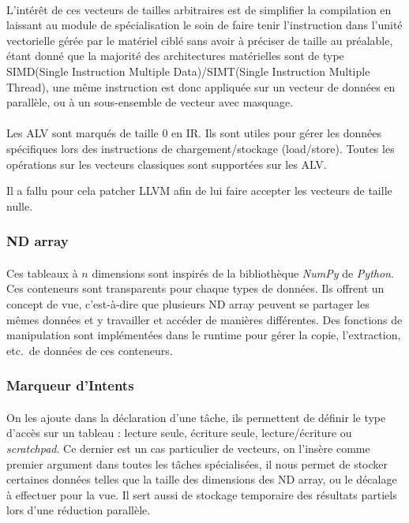 \paragraph{}
L'intérêt de ces vecteurs de tailles arbitraires est de simplifier la
compilation en laissant au module de spécialisation le soin de faire tenir
l'instruction dans l'unité vectorielle gérée par le matériel ciblé sans avoir à
préciser de taille au préalable, étant donné que la majorité des architectures
matérielles sont de type SIMD(Single Instruction Multiple Data)/SIMT(Single
Instruction Multiple Thread), une même instruction est donc appliquée sur un
vecteur de données en parallèle, ou à un sous-ensemble de vecteur avec
masquage.

\paragraph{}
Les ALV sont marqués de taille 0 en IR. Ils sont utiles pour gérer les données
spécifiques lors des instructions de chargement/stockage (load/store). Toutes
les opérations sur les vecteurs classiques sont supportées sur les ALV.

Il a fallu pour cela patcher LLVM afin de lui faire accepter les vecteurs de
taille nulle.

\subsubsection{ND array}
\paragraph{}
Ces tableaux à $n$ dimensions sont inspirés de la bibliothèque \emph{NumPy} de
\emph{Python}. Ces conteneurs sont transparents pour chaque types de données.
Ils offrent un concept de vue, c'est-à-dire que plusieurs ND array peuvent se
partager les mêmes données et y travailler et accéder de manières différentes.
Des fonctions de manipulation sont implémentées dans le runtime pour gérer la
copie, l'extraction, etc.\ de données de ces conteneurs.

\subsubsection{Marqueur d'Intents}
\paragraph{}
On les ajoute dans la déclaration d'une tâche, ils permettent de définir le type
d'accès sur un tableau : lecture seule, écriture seule, lecture/écriture ou
\emph{scratchpad}. Ce dernier est un cas particulier de vecteurs, on l'insère
comme premier argument dans toutes les tâches spécialisées, il nous permet de
stocker certaines données telles que la taille des dimensions des ND array, ou
le décalage à effectuer pour la vue. Il sert aussi de stockage temporaire des
résultats partiels lors d'une réduction parallèle.

